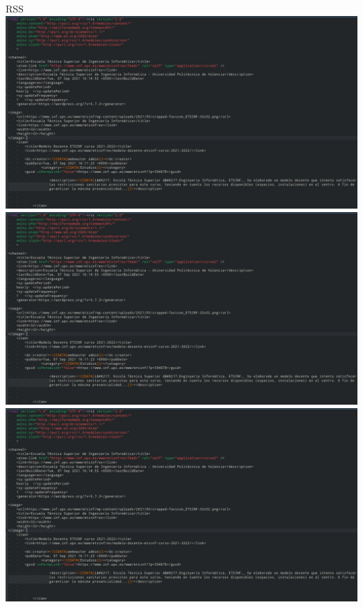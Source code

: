 \documentclass{beamer}
\begin{document}
  \begin{frame}[label=rss]{RSS}
    {
      \includegraphics[width=\textwidth,trim={0 0 13.5cm 0},clip]{rss-feed-example.png} 
    }
    {
      \includegraphics[width=\textwidth,trim={0 9cm 13.5cm 5cm},clip]{rss-feed-example.png} 
      \includegraphics[width=\textwidth,trim={0 0 19.75cm 16.3cm},clip]{rss-feed-example.png} 
    }
  \end{frame}
\end{document}
